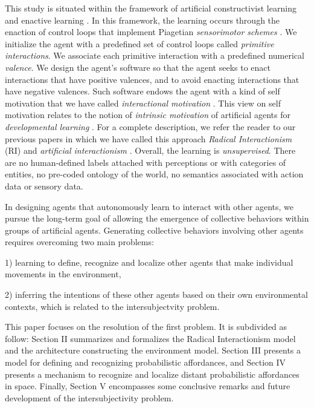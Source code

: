 \documentclass[conference]{IEEEtran}
\begin{document}
This study is situated within the framework of artificial constructivist learning \cite{wang_new_2012} and enactive learning \cite{froese2009enactiveAI}. 
In this framework, the learning occurs through the enaction of control loops that implement Piagetian \textit{sensorimotor schemes} \cite{piaget2013construction}.  
We initialize the agent with a predefined set of control loops called \textit{primitive interactions}. 
We associate each primitive interaction with a predefined numerical \textit{valence}.
We design the agent's software so that the agent seeks to enact interactions that have positive valences, and to avoid enacting interactions that have negative valences. 
Such software endows the agent with a kind of self motivation that we have called \textit{interactional motivation} \cite{georgeon_interactional_2012}.
This view on self motivation relates to the notion of \textit{intrinsic motivation} of artificial agents for \textit{developmental learning} \cite{oudeyer_intrinsic_2007}.
For a complete description, we refer the reader to our previous papers in which we have called this approach \textit{Radical Interactionism} (RI) \cite{georgeon:radical} and \textit{artificial interactionism} \cite{GuillerminGeorgeon2022}. 
Overall, the learning is \textit{unsupervised}. 
There are no human-defined labels attached with perceptions or with categories of entities, no pre-coded ontology of the world, no semantics associated with action data or sensory data.  


In designing agents that autonomously learn to interact with other agents, we pursue the long-term goal of allowing the emergence of collective behaviors within groups of artificial agents. Generating collective behaviors involving other agents requires overcoming two main problems:

1) learning to define, recognize and localize other agents that make individual movements in the environment,

2) inferring the intentions of these other agents based on their own environmental contexts, which is related to the intersubjectvity problem.

This paper focuses on the resolution of the first problem. 
It is subdivided as follow: Section II summarizes and formalizes the Radical Interactionism model and the architecture constructing the environment model. Section III presents a model for defining and recognizing probabilistic affordances, and Section IV presents a mechanism to recognize and localize distant probabilistic affordances in space. Finally, Section V encompasses some conclusive remarks and future development of the intersubjectivity problem.
\end{document}
